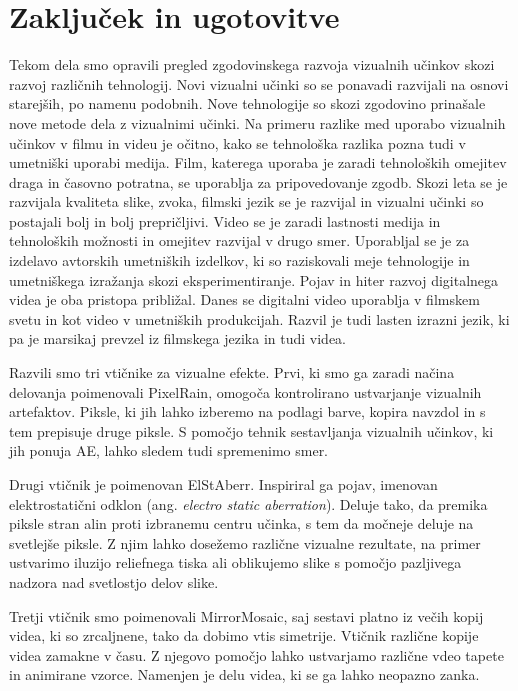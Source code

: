 \documentclass[a4paper, 12pt]{book}
\begin{document}
\chapter{Zaključek in ugotovitve}

Tekom dela smo opravili pregled zgodovinskega razvoja vizualnih učinkov skozi razvoj različnih tehnologij.
Novi vizualni učinki so se ponavadi razvijali na osnovi starejših, po namenu podobnih.
Nove tehnologije so skozi zgodovino prinašale nove metode dela z vizualnimi učinki.
Na primeru razlike med uporabo vizualnih učinkov v filmu in videu je očitno,
kako se tehnološka razlika pozna tudi v umetniški uporabi medija.
Film, katerega uporaba je zaradi tehnoloških omejitev draga in časovno potratna, se uporablja za pripovedovanje zgodb.
Skozi leta se je razvijala kvaliteta slike, zvoka, filmski jezik se je razvijal in vizualni učinki so postajali bolj in bolj prepričljivi.
Video se je zaradi lastnosti medija in tehnoloških možnosti in omejitev razvijal v drugo smer.
Uporabljal se je za izdelavo avtorskih umetniških izdelkov, ki so raziskovali meje tehnologije in umetniškega izražanja skozi eksperimentiranje.
Pojav in hiter razvoj digitalnega videa je oba pristopa približal.
Danes se digitalni video uporablja v filmskem svetu in kot video v umetniških produkcijah.
Razvil je tudi lasten izrazni jezik, ki pa je marsikaj prevzel iz filmskega jezika in tudi videa.

Razvili smo tri vtičnike za vizualne efekte.
Prvi, ki smo ga zaradi načina delovanja poimenovali PixelRain, omogoča kontrolirano ustvarjanje vizualnih artefaktov.
Piksle, ki jih lahko izberemo na podlagi barve, kopira navzdol in s tem prepisuje druge piksle.
S pomočjo tehnik sestavljanja vizualnih učinkov, ki jih ponuja AE, lahko sledem tudi spremenimo smer.

Drugi vtičnik je poimenovan ElStAberr.
Inspiriral ga pojav, imenovan elektrostatični odklon (ang. {\it electro static aberration}).
Deluje tako, da premika piksle stran alin proti izbranemu centru učinka, s tem da močneje deluje na svetlejše piksle.
Z njim lahko dosežemo različne vizualne rezultate, na primer ustvarimo iluzijo reliefnega tiska ali oblikujemo slike s pomočjo pazljivega nadzora nad svetlostjo delov slike.

Tretji vtičnik smo poimenovali MirrorMosaic, saj sestavi platno iz večih kopij videa, ki so zrcaljnene, tako da dobimo vtis simetrije.
Vtičnik različne kopije videa zamakne v času.
Z njegovo pomočjo lahko ustvarjamo različne vdeo tapete in animirane vzorce.
Namenjen je delu videa, ki se ga lahko neopazno zanka.
\end{document}
